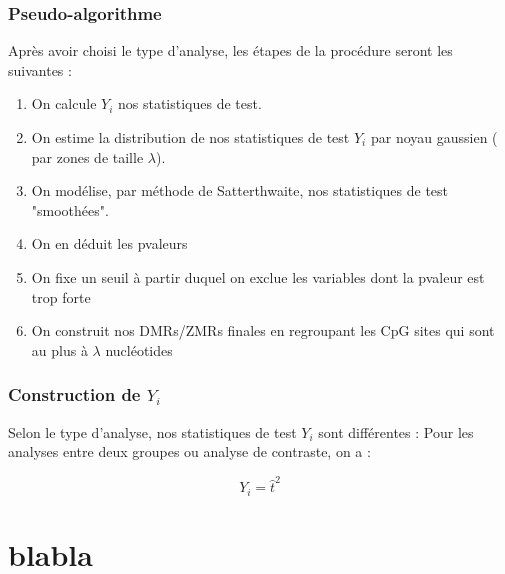 \documentclass{beamer}
\begin{document}
\begin{frame}
\frametitle{Pseudo-algorithme}
Après avoir choisi le type d'analyse, les étapes de la procédure seront les suivantes :
\begin{enumerate}
\item<2-> On calcule $Y_{i}$ nos statistiques de test.
\item<3-> On estime la distribution de nos statistiques de test $Y_{i}$ par noyau gaussien ( par zones de taille $\lambda$).
\item<4-> On modélise, par méthode de Satterthwaite, nos statistiques de test "smoothées".
\item<5-> On en déduit les pvaleurs
\item<6-> On fixe un seuil à partir duquel on exclue les variables dont la pvaleur est trop forte
\item<7-> On construit nos DMRs/ZMRs finales en regroupant les CpG sites qui sont au plus à $\lambda$ nucléotides
\end{enumerate}
\end{frame}

\begin{frame}
\frametitle{Construction de $Y_i$ }
Selon le type d'analyse, nos statistiques de test $Y_i$ sont différentes :
Pour les analyses entre deux groupes ou analyse de contraste, on a :

$$ Y_i = \hat{t}^2 $$


\end{frame}








\section{blabla}

\begin{frame}
\end{frame}
\end{document}
